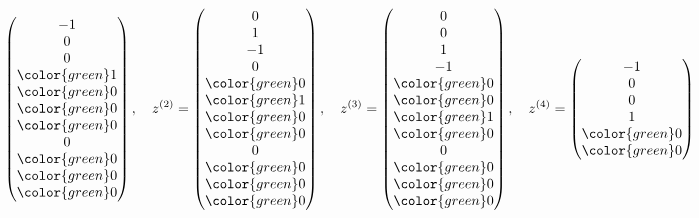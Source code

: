 \begin{loesung}
\[\begin{pmatrix}
             -1\\
              0\\
              0\\
\color{green} 1\\
\color{green} 0\\
\color{green} 0\\
\color{green} 0\\
              0\\
\color{green} 0\\
\color{green} 0\\
\color{green} 0
\end{pmatrix}
,\quad
z^{(2)}=\begin{pmatrix}
              0\\
              1\\
             -1\\
              0\\
\color{green} 0\\
\color{green} 1\\
\color{green} 0\\
\color{green} 0\\
              0\\
\color{green} 0\\
\color{green} 0\\
\color{green} 0
\end{pmatrix}
,\quad
z^{(3)}=\begin{pmatrix}
              0\\
              0\\
              1\\
             -1\\
\color{green} 0\\
\color{green} 0\\
\color{green} 1\\
\color{green} 0\\
              0\\
\color{green} 0\\
\color{green} 0\\
\color{green} 0
\end{pmatrix}
,\quad
z^{(4)}=\begin{pmatrix}
             -1\\
              0\\
              0\\
              1\\
\color{green} 0\\
\color{green} 0\\

\end{pmatrix}\]
\end{loesung}
